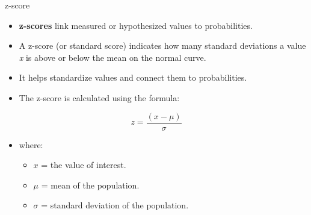 \documentclass[
  ignorenonframetext,
]{beamer}
\providecommand{\tightlist}{%
  \setlength{\itemsep}{0pt}\setlength{\parskip}{0pt}}
\begin{document}
\begin{frame}{z-score}
\label{z-score}
\begin{itemize}
\tightlist
\item
  \textbf{z-scores} link measured or hypothesized values to
  probabilities.
\end{itemize}

\begin{itemize}
\tightlist
\item
  A z-score (or standard score) indicates how many standard deviations a
  value \emph{\emph{x}} is above or below the mean on the normal curve.
\end{itemize}

\begin{itemize}
\tightlist
\item
  It helps standardize values and connect them to probabilities.
\end{itemize}

\begin{itemize}
\tightlist
\item
  The z-score is calculated using the formula:
\end{itemize}

\[ z = \frac{(x - \mu)}{\sigma} \]

\begin{itemize}
\tightlist
\item
  where:

  \begin{itemize}
  \tightlist
  \item
    \(x\) = the value of interest.\\
  \item
    \(\mu\) = mean of the population.\\
  \item
    \(\sigma\) = standard deviation of the population.
  \end{itemize}
\end{itemize}
\end{frame}
\end{document}
